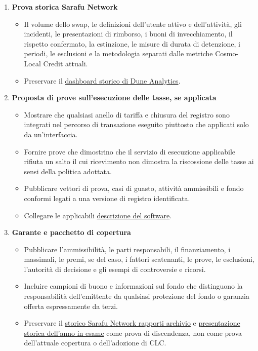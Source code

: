 \documentclass[11pt]{article}
\begin{document}
\begin{enumerate}[leftmargin=*]
\item \textbf{Prova storica Sarafu Network}
\begin{itemize}[leftmargin=*]
\item Il volume dello swap, le definizioni dell'utente attivo e dell'attività, gli incidenti, le presentazioni di rimborso, i buoni di invecchiamento, il rispetto confermato, la estinzione, le misure di durata di detenzione, i periodi, le esclusioni e la metodologia separati dalle metriche Cosmo-Local Credit attuali.
\item Preservare il \href{https://dune.com/grassrootseconomics/sarafu-network}{dashboard storico di Dune Analytics}.
\end{itemize}
\item \textbf{Proposta di prove sull'esecuzione delle tasse, se applicata}
\begin{itemize}[leftmargin=*]
\item Mostrare che qualsiasi anello di tariffa e chiusura del registro sono integrati nel percorso di transazione eseguito piuttosto che applicati solo da un'interfaccia.
\item Fornire prove che dimostrino che il servizio di esecuzione applicabile rifiuta un salto il cui ricevimento non dimostra la riscossione delle tasse ai sensi della politica adottata.
\item Pubblicare vettori di prova, casi di guasto, attività ammissibili e fondo conformi legati a una versione di registro identificata.
\item Collegare le applicabili \href{https://software.grassecon.org}{descrizione del software}.
\end{itemize}
\item \textbf{Garante e pacchetto di copertura}
\begin{itemize}[leftmargin=*]
\item Pubblicare l'ammissibilità, le parti responsabili, il finanziamento, i massimali, le premi, se del caso, i fattori scatenanti, le prove, le esclusioni, l'autorità di decisione e gli esempi di controversie e ricorsi.
\item Incluire campioni di buono e informazioni sul fondo che distinguono la responsabilità dell'emittente da qualsiasi protezione del fondo o garanzia offerta espressamente da terzi.
\item Preservare il \href{https://sarafu.network/reports}{storico Sarafu Network rapporti archivio} e \href{https://youtu.be/5yGaP31bvs0?si=fZ-AMTEXsmVR8Ulv}{presentazione storica dell'anno in esame} come prova di discendenza, non come prova dell'attuale copertura o dell'adozione di CLC.

\end{itemize}
\end{enumerate}
\end{document}
